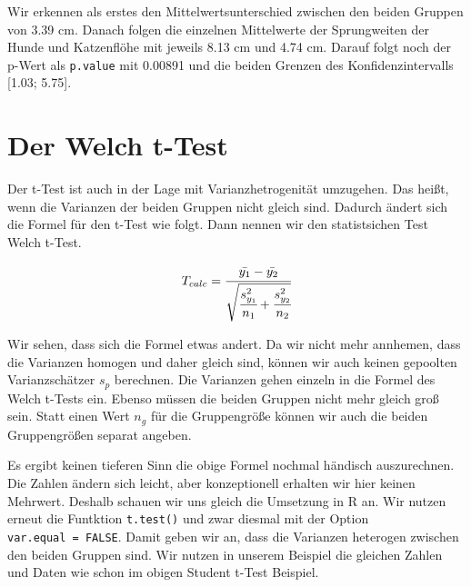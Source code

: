 \documentclass[
  letterpaper,
]{scrbook}
\begin{document}
Wir erkennen als erstes den Mittelwertsunterschied zwischen den beiden
Gruppen von 3.39 cm. Danach folgen die einzelnen Mittelwerte der
Sprungweiten der Hunde und Katzenflöhe mit jeweils 8.13 cm und 4.74 cm.
Darauf folgt noch der p-Wert als \texttt{p.value} mit 0.00891 und die
beiden Grenzen des Konfidenzintervalls {[}1.03; 5.75{]}.

\hypertarget{der-welch-t-test}{%
\section{Der Welch t-Test}\label{der-welch-t-test}}

Der t-Test ist auch in der Lage mit Varianzhetrogenität umzugehen. Das
heißt, wenn die Varianzen der beiden Gruppen nicht gleich sind. Dadurch
ändert sich die Formel für den t-Test wie folgt. Dann nennen wir den
statistsichen Test Welch t-Test.

\[
T_{calc} = \cfrac{\bar{y_1} - \bar{y_2}}{\sqrt{\cfrac{s^2_{y_1}}{n_1} + \cfrac{s^2_{y_2}}{n_2}}}
\]

Wir sehen, dass sich die Formel etwas andert. Da wir nicht mehr
annhemen, dass die Varianzen homogen und daher gleich sind, können wir
auch keinen gepoolten Varianzschätzer \(s_p\) berechnen. Die Varianzen
gehen einzeln in die Formel des Welch t-Tests ein. Ebenso müssen die
beiden Gruppen nicht mehr gleich groß sein. Statt einen Wert \(n_g\) für
die Gruppengröße können wir auch die beiden Gruppengrößen separat
angeben.


Es ergibt keinen tieferen Sinn die obige Formel nochmal händisch
auszurechnen. Die Zahlen ändern sich leicht, aber konzeptionell erhalten
wir hier keinen Mehrwert. Deshalb schauen wir uns gleich die Umsetzung
in R an. Wir nutzen erneut die Funtktion \texttt{t.test()} und zwar
diesmal mit der Option \texttt{var.equal\ =\ FALSE}. Damit geben wir an,
dass die Varianzen heterogen zwischen den beiden Gruppen sind. Wir
nutzen in unserem Beispiel die gleichen Zahlen und Daten wie schon im
obigen Student t-Test Beispiel.
\end{document}
